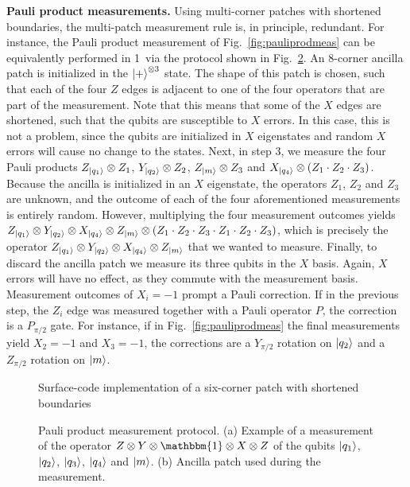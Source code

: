 \documentclass[prx,aps,letterpaper,twocolumn,allowfontchageintitle=true,accepted=2019-02-01]{quantumarticle}
\begin{document}
\textbf{Pauli product measurements.} Using multi-corner patches with shortened boundaries, the multi-patch measurement rule is, in principle, redundant. For instance, the Pauli product measurement of Fig.~\ref{fig:pauliprodmeas} can be equivalently performed in 1\clock \ via the protocol shown in Fig.~\ref{fig:pauliprodmeasold}. An 8-corner ancilla patch is initialized in the $\ket{+}^{\otimes 3}$ state. The shape of this patch is chosen, such that each of the four $Z$ edges is adjacent to one of the four operators that are part of the measurement. Note that this means that some of the $X$ edges are shortened, such that the qubits are susceptible to $X$ errors. In this case, this is not a problem, since the qubits are initialized in $X$ eigenstates and random $X$ errors will cause no change to the states. Next, in step 3, we measure the four Pauli products $Z_{\ket{q_1}} \otimes Z_1$, $Y_{\ket{q_2}} \otimes Z_2$, $Z_{\ket{m}} \otimes Z_3$ and $X_{\ket{q_4}} \otimes (Z_1 \cdot Z_2 \cdot Z_3)$. Because the ancilla is initialized in an $X$ eigenstate, the operators $Z_1$, $Z_2$ and $Z_3$ are unknown, and the outcome of each of the four aforementioned measurements is entirely random. However, multiplying the four measurement outcomes yields $Z_{\ket{q_1}}\otimes Y_{\ket{q_2}} \otimes X_{\ket{q_4}} \otimes Z_{\ket{m}} \otimes (Z_1 \cdot Z_2 \cdot Z_3 \cdot Z_1 \cdot Z_2 \cdot Z_3)$, which is precisely the operator $Z_{\ket{q_1}}\otimes Y_{\ket{q_2}} \otimes X_{\ket{q_4}} \otimes Z_{\ket{m}}$ that we wanted to measure. Finally, to discard the ancilla patch we measure its three qubits in the $X$ basis. Again, $X$ errors will have no effect, as they commute with the measurement basis. Measurement outcomes of $X_i=-1$ prompt a Pauli correction. If in the previous step, the $Z_i$ edge was measured together with a Pauli operator $P$, the correction is a $P_{\pi/2}$ gate. For instance, if in Fig.~\ref{fig:pauliprodmeas} the final measurements yield $X_2 = -1$ and $X_3 = -1$, the corrections are a $Y_{\pi/2}$ rotation on $\ket{q_2}$ and a $Z_{\pi/2}$ rotation on $\ket{m}$.



\begin{figure}[!t]
\centering
\def\svgwidth{\linewidth}

\caption{Surface-code implementation of a six-corner patch with shortened boundaries}
\label{fig:scop5}
\end{figure}

\begin{figure}[!t]
\centering
\def\svgwidth{\linewidth}

\caption{Pauli product measurement protocol. (a) Example of a measurement of the operator $Z\otimes Y \otimes \mathbbm{1} \otimes X \otimes Z$ of the qubits $\ket{q_1}$, $\ket{q_2}$, $\ket{q_3}$, $\ket{q_4}$ and $\ket{m}$. (b) Ancilla patch used during the measurement.}
\label{fig:pauliprodmeasold}
\end{figure}
\end{document}
